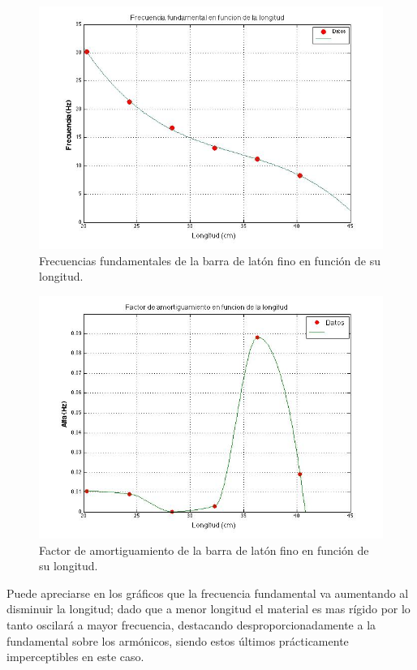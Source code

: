 \documentclass[twoside,twocolumn,a4paper]{article}
\begin{document}
\begin{figure}[H]
\includegraphics[width=\linewidth]{fvsl.jpg}
\caption{Frecuencias fundamentales de la barra de lat\'on fino en funci\'on de su longitud.}
\label{fig:fvsl}
\end{figure}

\begin{figure}[H]
\includegraphics[width=\linewidth]{avsl.jpg}
\caption{Factor de amortiguamiento de la barra de lat\'on fino en funci\'on de su longitud.}
\label{fig:avsl}
\end{figure}

Puede apreciarse en los gr\'aficos que la frecuencia fundamental va aumentando al disminuir la longitud; dado que a menor longitud el material es mas r\'igido por lo tanto oscilar\'a a mayor frecuencia, destacando desproporcionadamente a la fundamental sobre los arm\'onicos, siendo estos \'ultimos pr\'acticamente imperceptibles en este caso. \newline
\end{document}
